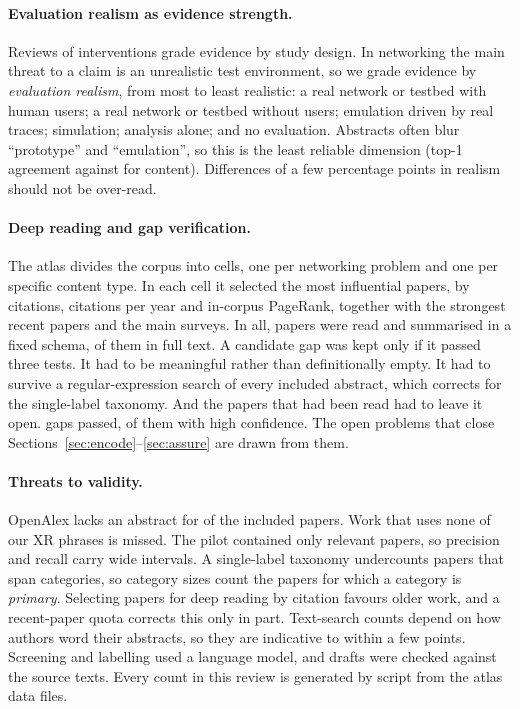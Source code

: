 \paragraph{Evaluation realism as evidence strength.} Reviews of interventions grade evidence by study
design. In networking the main threat to a claim is an unrealistic test environment, so we grade evidence
by \emph{evaluation realism}, from most to least realistic: a real network or testbed with human users; a
real network or testbed without users; emulation driven by real traces; simulation; analysis alone; and no
evaluation. Abstracts often blur ``prototype'' and ``emulation'', so this is the least reliable dimension
(top-1 agreement \nxrAccEval{} against \nxrAccCont{} for content). Differences of a few percentage points
in realism should not be over-read.

\paragraph{Deep reading and gap verification.} The atlas divides the corpus into \nxrDeepCells{} cells,
one per networking problem and one per specific content type. In each cell it selected the most
influential papers, by citations, citations per year and in-corpus PageRank, together with the strongest
recent papers and the main surveys. In all, \nxrDeepReads{} papers were read and summarised in a fixed
schema, \nxrDeepFulltext{} of them in full text. A candidate gap was kept only if it passed three tests.
It had to be meaningful rather than definitionally empty. It had to survive a regular-expression search
of every included abstract, which corrects for the single-label taxonomy. And the papers that had been
read had to leave it open. \nxrGaps{} gaps passed, \nxrGapsHigh{} of them with high confidence. The
open problems that close Sections~\ref{sec:encode}--\ref{sec:assure} are drawn from them.

\paragraph{Threats to validity.} OpenAlex lacks an abstract for \nxrShareNoAbstract{} of the included
papers. Work that uses none of our XR phrases is missed. The pilot contained only \nxrPilotRelevant{}
relevant papers, so precision and recall carry wide intervals. A single-label taxonomy undercounts papers
that span categories, so category sizes count the papers for which a category is \emph{primary}. Selecting
papers for deep reading by citation favours older work, and a recent-paper quota corrects this only in
part. Text-search counts depend on how authors word their abstracts, so they are indicative to within a
few points. Screening and labelling used a language model, and drafts were checked against the source
texts. Every count in this review is generated by script from the atlas data files.
